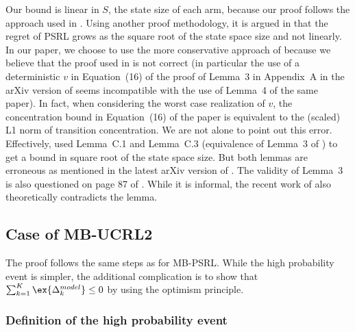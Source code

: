 \begin{subappendices}
Our bound is linear in $S$, the state size of each arm, because our proof follows the approach used in \cite{osband2013more}. Using another proof methodology, it is argued in \cite{osband2017posterior} that the regret of PSRL grows as the square root of the state space size and not linearly. In our paper, we choose to use the more conservative approach of \cite{osband2013more} because we believe that the proof used in \cite{osband2017posterior} is not correct (in particular the use of a deterministic $v$ in Equation~(16) of the proof of Lemma~3 in Appendix~A in the arXiv version of \cite{osband2017posterior} seems incompatible with the use of Lemma~4 of the same paper).
In fact, when considering the worst case realization of $v$, the concentration bound in Equation~(16) of the paper is equivalent to the (scaled) L1 norm of transition concentration.
We are not alone to point out this error. Effectively, \cite{agrawal2017posterior} used Lemma~C.1 and Lemma~C.3 (equivalence of Lemma~3 of \cite{osband2017posterior}) to get a bound in square root of the state space size. But both lemmas are erroneous as mentioned in the latest arXiv version of \cite{agrawal2017posterior}. The validity of Lemma~3 is also questioned on page 87 of \cite{fruit2019exploration}. While it is informal, the recent work of \cite{qian2020concentration} also theoretically contradicts the lemma.

\subsection{Case of MB-UCRL2}
\label{ssec:proof_UCRL2}

The proof follows the same steps as for MB-PSRL. While the high probability event is simpler, the additional complication is to show that $\sum_{k=1}^K\ex{\Delta^{model}_k}\le0$ by using the optimism principle. 

\subsubsection{Definition of the high probability event} 


\end{subappendices}
